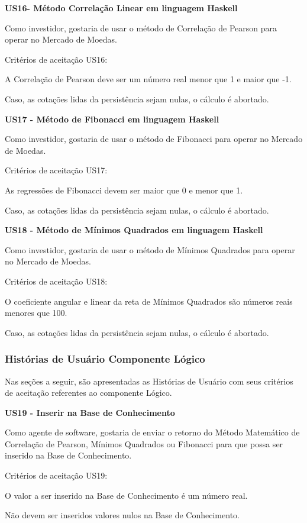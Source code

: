 \textbf{US16- Método Correlação Linear em linguagem Haskell}

Como investidor, gostaria de usar o método de Correlação de Pearson para operar no Mercado de Moedas.

Critérios de aceitação US16:

A Correlação de Pearson deve ser um número real menor que 1 e maior que -1.

Caso, as cotações lidas da persistência sejam nulas, o cálculo é abortado.

\textbf{US17 - Método de Fibonacci em linguagem Haskell}

Como investidor, gostaria de usar o método de Fibonacci para operar no Mercado de Moedas.

Critérios de aceitação US17:

As regressões de Fibonacci devem ser maior que 0 e menor que 1.

Caso, as cotações lidas da persistência sejam nulas, o cálculo é abortado.

\textbf{US18 - Método de Mínimos Quadrados em linguagem Haskell}

Como investidor, gostaria de usar o método de Mínimos Quadrados para operar no Mercado de Moedas.

Critérios de aceitação US18:

O coeficiente angular e linear da reta de Mínimos Quadrados são números reais menores que 100.

Caso, as cotações lidas da persistência sejam nulas, o cálculo é abortado.

\subsubsection{Histórias de Usuário Componente Lógico}

Nas seções a seguir, são apresentadas as Histórias de Usuário com seus critérios de aceitação referentes ao componente Lógico.	

\textbf{US19 - Inserir na Base de Conhecimento}

Como agente de software, gostaria de enviar o retorno do Método Matemático de Correlação de Pearson, Mínimos Quadrados ou Fibonacci para que possa ser inserido na Base de Conhecimento.

Critérios de aceitação US19:

O valor a ser inserido na Base de Conhecimento é um número real.

Não devem ser inseridos valores nulos na Base de Conhecimento.

